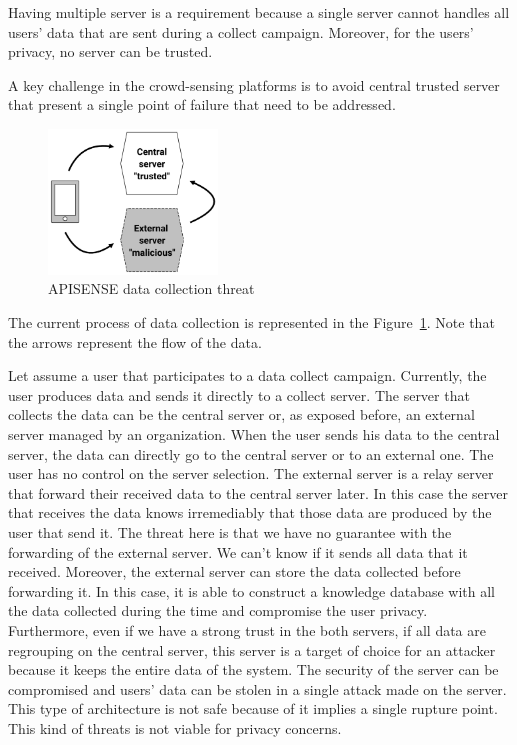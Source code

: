 Having multiple server is a requirement because a single server cannot handles all users' data that are sent during a collect campaign.
Moreover, for the users' privacy, no server can be trusted.

A key challenge in the crowd-sensing platforms is to avoid central trusted server that present a single point of failure that need to be addressed.

\begin{figure}[h]
    \centering
    \includegraphics[width=0.4\textwidth]{figures/threat}
    \caption{\label{Threat} APISENSE data collection threat}
\end{figure}

The current process of data collection is represented in the Figure~\ref{Threat}.
Note that the arrows represent the flow of the data.

Let assume a user that participates to a data collect campaign.
Currently, the user produces data and sends it directly to a collect server.
The server that collects the data can be the central server or, as exposed before, an external server managed by an organization.
When the user sends his data to the central server, the data can directly go to the central server or to an external one.
The user has no control on the server selection.
The external server is a relay server that forward their received data to the central server later.
In this case the server that receives the data knows irremediably that those data are produced by the user that send it.
The threat here is that we have no guarantee with the forwarding of the external server.
We can't know if it sends all data that it received.
Moreover, the external server can store the data collected before forwarding it.
In this case, it is able to construct a knowledge database with all the data collected during the time and compromise the user privacy.
Furthermore, even if we have a strong trust in the both servers, if all data are regrouping on the central server, this server is a target of choice for an attacker because it keeps the entire data of the system.
The security of the server can be compromised and users' data can be stolen in a single attack made on the server.
This type of architecture is not safe because of it implies a single rupture point.
This kind of threats is not viable for privacy concerns.

